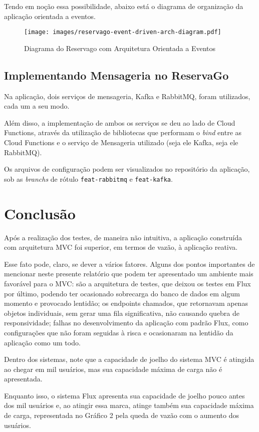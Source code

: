 \documentclass[12pt, openright, oneside, a4paper, article,
  section=TITLE
]{abntex2}
\begin{document}
Tendo em noção essa possibilidade, abaixo está o diagrama de organização da aplicação orientada a eventos.

\begin{figure}[htb]
  \begin{center}
    \texttt{[image: images/reservago-event-driven-arch-diagram.pdf]}
  \end{center}
  \caption{Diagrama do Reservago com Arquitetura Orientada a Eventos}
\end{figure}

\subsection{Implementando Mensageria no ReservaGo}

Na aplicação, dois serviços de mensageria, Kafka e RabbitMQ, foram utilizados, cada um a seu modo.

Além disso, a implementação de ambos os serviços se deu ao lado de Cloud Functions, através da utilização de bibliotecas que performam o \textit{bind} entre as Cloud Functions e o serviço de Mensageria utilizado (seja ele Kafka, seja ele RabbitMQ).

Os arquivos de configuração podem ser visualizados no repositório da aplicação, sob as \textit{branchs} de rótulo \texttt{feat-rabbitmq} e \texttt{feat-kafka}.

\section{Conclusão}

Após a realização dos testes, de maneira não intuitiva, a aplicação construída com arquitetura MVC foi superior, em termos de vazão, à aplicação reativa.

Esse fato pode, claro, se dever a vários fatores. Alguns dos pontos importantes de mencionar neste presente relatório que podem ter apresentado um ambiente mais favorável para o MVC: são a arquitetura de testes, que deixou os testes em Flux por último, podendo ter ocasionado sobrecarga do banco de dados em algum momento e provocado lentidão; os endpoints chamados, que retornavam apenas objetos individuais, sem gerar uma fila significativa, não causando quebra de responsividade; falhas no desenvolvimento da aplicação com padrão Flux, como configurações que não foram seguidas à risca e ocasionaram na lentidão da aplicação como um todo.

Dentro dos sistemas, note que a capacidade de joelho do sistema MVC é atingida ao chegar em mil usuários, mas sua capacidade máxima de carga não é apresentada.

Enquanto isso, o sistema Flux apresenta sua capacidade de joelho pouco antes dos mil usuários e, ao atingir essa marca, atinge também sua capacidade máxima de carga, representada no Gráfico 2 pela queda de vazão com o aumento dos usuários.
\end{document}
